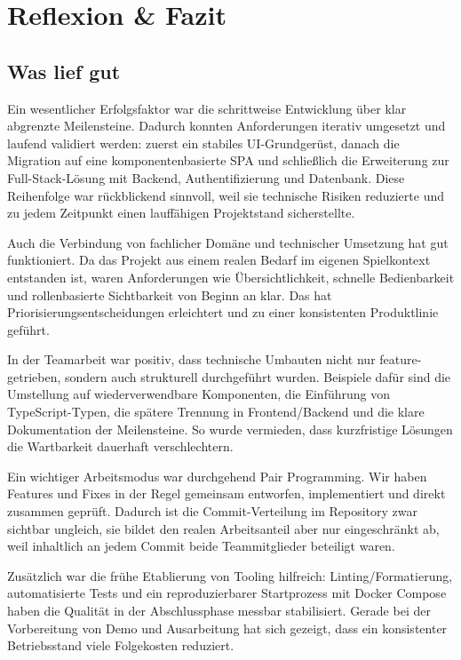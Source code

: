 \section{Reflexion \& Fazit}

\subsection{Was lief gut}

Ein wesentlicher Erfolgsfaktor war die schrittweise Entwicklung über klar
abgrenzte Meilensteine.
Dadurch konnten Anforderungen iterativ umgesetzt und laufend validiert werden:
zuerst ein stabiles UI-Grundgerüst, danach die Migration auf eine
komponentenbasierte SPA und schließlich die Erweiterung zur Full-Stack-Lösung
mit Backend, Authentifizierung und Datenbank.
Diese Reihenfolge war rückblickend sinnvoll, weil sie technische Risiken
reduzierte und zu jedem Zeitpunkt einen lauffähigen Projektstand sicherstellte.

Auch die Verbindung von fachlicher Domäne und technischer Umsetzung hat gut
funktioniert.
Da das Projekt aus einem realen Bedarf im eigenen Spielkontext entstanden ist,
waren Anforderungen wie Übersichtlichkeit, schnelle Bedienbarkeit und
rollenbasierte Sichtbarkeit von Beginn an klar.
Das hat Priorisierungsentscheidungen erleichtert und zu einer konsistenten
Produktlinie geführt.

In der Teamarbeit war positiv, dass technische Umbauten nicht nur
feature-getrieben, sondern auch strukturell durchgeführt wurden.
Beispiele dafür sind die Umstellung auf wiederverwendbare Komponenten, die
Einführung von TypeScript-Typen, die spätere Trennung in Frontend/Backend und
die klare Dokumentation der Meilensteine.
So wurde vermieden, dass kurzfristige Lösungen die Wartbarkeit dauerhaft
verschlechtern.

Ein wichtiger Arbeitsmodus war durchgehend Pair Programming.
Wir haben Features und Fixes in der Regel gemeinsam entworfen, implementiert
und direkt zusammen geprüft.
Dadurch ist die Commit-Verteilung im Repository zwar sichtbar ungleich, sie
bildet den realen Arbeitsanteil aber nur eingeschränkt ab, weil inhaltlich an
jedem Commit beide Teammitglieder beteiligt waren.

Zusätzlich war die frühe Etablierung von Tooling hilfreich:
Linting/Formatierung, automatisierte Tests und ein reproduzierbarer
Startprozess mit Docker Compose haben die Qualität in der Abschlussphase
messbar stabilisiert.
Gerade bei der Vorbereitung von Demo und Ausarbeitung hat sich gezeigt, dass
ein konsistenter Betriebsstand viele Folgekosten reduziert.


